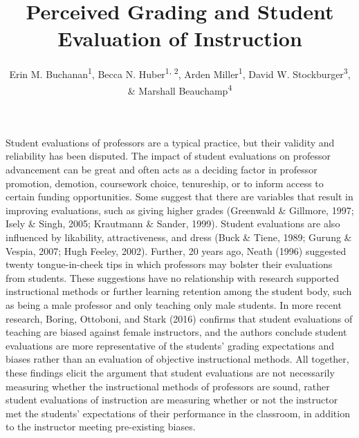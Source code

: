 \documentclass[,man]{apa6}
\title{Perceived Grading and Student Evaluation of Instruction}
\author{Erin M. Buchanan\textsuperscript{1}, Becca N.
Huber\textsuperscript{1, 2}, Arden Miller\textsuperscript{1}, David W.
Stockburger\textsuperscript{3}, \& Marshall Beauchamp\textsuperscript{4}}
\date{}
\affiliation{
\vspace{0.5cm}
\textsuperscript{1} Missouri State University\\\textsuperscript{2} Idaho State University\\\textsuperscript{3} US Air Force Academy\\\textsuperscript{4} University of Missouri - Kansas City}
\theoremstyle{definition}
\theoremstyle{definition}
\theoremstyle{definition}
\theoremstyle{remark}
\begin{document}
\maketitle

Student evaluations of professors are a typical practice, but their
validity and reliability has been disputed. The impact of student
evaluations on professor advancement can be great and often acts as a
deciding factor in professor promotion, demotion, coursework choice,
tenureship, or to inform access to certain funding opportunities. Some
suggest that there are variables that result in improving evaluations,
such as giving higher grades (Greenwald \& Gillmore, 1997; Isely \&
Singh, 2005; Krautmann \& Sander, 1999). Student evaluations are also
influenced by likability, attractiveness, and dress (Buck \& Tiene,
1989; Gurung \& Vespia, 2007; Hugh Feeley, 2002). Further, 20 years ago,
Neath (1996) suggested twenty tongue-in-cheek tips in which professors
may bolster their evaluations from students. These suggestions have no
relationship with research supported instructional methods or further
learning retention among the student body, such as being a male
professor and only teaching only male students. In more recent research,
Boring, Ottoboni, and Stark (2016) confirms that student evaluations of
teaching are biased against female instructors, and the authors conclude
student evaluations are more representative of the students' grading
expectations and biases rather than an evaluation of objective
instructional methods. All together, these findings elicit the argument
that student evaluations are not necessarily measuring whether the
instructional methods of professors are sound, rather student
evaluations of instruction are measuring whether or not the instructor
met the students' expectations of their performance in the classroom, in
addition to the instructor meeting pre-existing biases.
\end{document}
